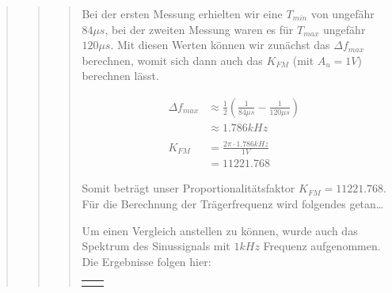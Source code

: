 \begin{quote}
\begin{quote}
\begin{quote}
        Bei der ersten Messung erhielten wir eine $T_{min}$ von ungefähr 
        $84\mu s$, bei der zweiten Messung waren es für $T_{max}$ ungefähr 
        $120\mu s$. Mit diesen Werten können wir zunächst das $\Delta f_{max}$
        berechnen, womit sich dann auch das $K_{FM}$ (mit $A_u = 1V$) berechnen
        lässt.
        
      \begin{equation*}
       \begin{split}
		\Delta f_{max} &\approx \frac{1}{2} (\frac{1}{84\mu s} - \frac{1}{120\mu s})\\
					   &\approx 1.786 kHz \\
		\\		
	    K_{FM} &= \frac{2 \pi \cdot 1.786 kHz}{1 V}\\
	    	   &= 11221.768    		
       \end{split}
     \end{equation*}
     
        
        Somit beträgt unser Proportionalitätsfaktor $K_{FM} = 11221.768$.\\
        
        Für die Berechnung der Trägerfrequenz wird folgendes getan\ldots 
        
        Um einen Vergleich anstellen zu können, wurde auch das Spektrum des
        Sinussignals mit $1 kHz$ Frequenz aufgenommen. Die Ergebnisse folgen
        hier:
        
                \begin{center}
            \begin{tabular}{ll}

            \hspace{-10em}
                \begin{minipage}{0.6\textwidth}


\end{minipage}
\end{tabular}
\end{center}
\end{quote}
\end{quote}
\end{quote}
